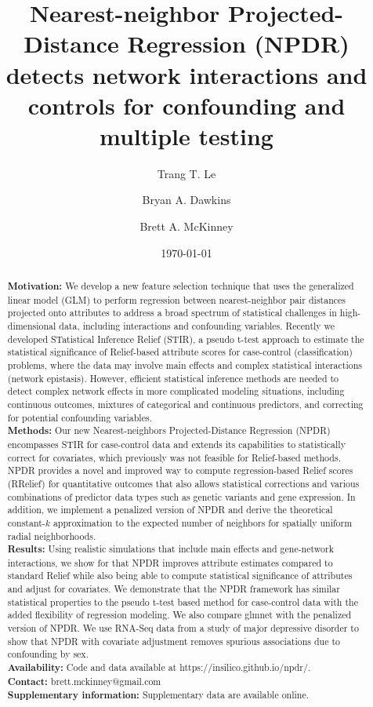 \documentclass[10pt]{article}
\title{Nearest-neighbor Projected-Distance Regression (NPDR) detects network interactions and controls for confounding and multiple testing}
\author[1]{Trang T. Le}
\author[2]{Bryan A. Dawkins}
\author[2,3*]{Brett A. McKinney}
\affil[1]{Department of Biostatistics, Epidemiology and Informatics,
University of Pennsylvania, Philadelphia, PA 19104}
\affil[2]{Department of Mathematics, University of Tulsa, Tulsa, OK 74104}
\affil[3]{Tandy School of Computer Science, University of Tulsa, Tulsa, OK 74104}
\date{\today}
\begin{document}

\maketitle
\begin{abstract}
        
{\bf Motivation:} We develop a new feature selection technique that uses the generalized linear model (GLM) to perform regression between nearest-neighbor pair distances projected onto attributes to address a broad spectrum of statistical challenges in high-dimensional data, including interactions and confounding variables. Recently we developed STatistical Inference Relief (STIR), a pseudo t-test approach to estimate the statistical significance of Relief-based attribute scores for case-control (classification) problems, where the data may involve main effects and complex statistical interactions (network epistasis). However, efficient statistical inference methods are needed to detect complex network effects in more complicated modeling situations, including continuous outcomes, mixtures of categorical and continuous predictors, and correcting for potential confounding variables. 
\\
{\bf Methods:} Our new Nearest-neighbors Projected-Distance Regression (NPDR) encompasses STIR for case-control data and extends its capabilities to statistically correct for covariates, which previously was not feasible for Relief-based methods. NPDR provides a novel and improved way to compute regression-based Relief scores (RRelief) for quantitative outcomes that also allows statistical corrections and various combinations of predictor data types such as genetic variants and gene expression. In addition, we implement a penalized version of NPDR and derive the theoretical constant-$k$ approximation to the expected number of neighbors for spatially uniform radial neighborhoods. 
\\
{\bf Results:} Using realistic simulations that include main effects and gene-network interactions, we show for that NPDR improves attribute estimates compared to standard Relief while also being able to compute statistical significance of attributes and adjust for covariates.  We demonstrate that the NPDR framework has similar statistical properties to the pseudo t-test based method for case-control data with the added flexibility of regression modeling. We also compare glmnet with the penalized version of NPDR. We use RNA-Seq data from a study of major depressive disorder to show that NPDR with covariate adjustment removes spurious associations due to confounding by sex. 
\\
\textbf{Availability:} Code and data available at {{https://insilico.github.io/npdr/}}.\\
\textbf{Contact:} {{brett.mckinney@gmail.com}}\\
\textbf{Supplementary information:} Supplementary data are available online.


\end{abstract}
\end{document}
